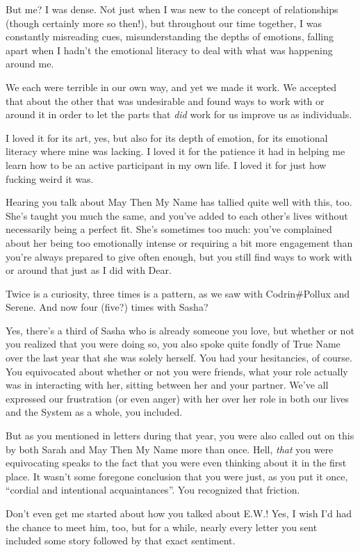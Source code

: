 But me? I was dense. Not just when I was new to the concept of relationships (though certainly more so then!), but throughout our time together, I was constantly misreading cues, misunderstanding the depths of emotions, falling apart when I hadn't the emotional literacy to deal with what was happening around me.

We each were terrible in our own way, and yet we made it work. We accepted that about the other that was undesirable and found ways to work with or around it in order to let the parts that \emph{did} work for us improve us as individuals.

I loved it for its art, yes, but also for its depth of emotion, for its emotional literacy where mine was lacking. I loved it for the patience it had in helping me learn how to be an active participant in my own life. I loved it for just how fucking weird it was.

Hearing you talk about May Then My Name has tallied quite well with this, too. She's taught you much the same, and you've added to each other's lives without necessarily being a perfect fit. She's sometimes too much: you've complained about her being too emotionally intense or requiring a bit more engagement than you're always prepared to give often enough, but you still find ways to work with or around that just as I did with Dear.

Twice is a curiosity, three times is a pattern, as we saw with Codrin\#Pollux and Serene. And now four (five?) times with Sasha?

Yes, there's a third of Sasha who is already someone you love, but whether or not you realized that you were doing so, you also spoke quite fondly of True Name over the last year that she was solely herself. You had your hesitancies, of course. You equivocated about whether or not you were friends, what your role actually was in interacting with her, sitting between her and your partner. We've all expressed our frustration (or even anger) with her over her role in both our lives and the System as a whole, you included.

But as you mentioned in letters during that year, you were also called out on this by both Sarah and May Then My Name more than once. Hell, \emph{that} you were equivocating speaks to the fact that you were even thinking about it in the first place. It wasn't some foregone conclusion that you were just, as you put it once, ``cordial and intentional acquaintances''. You recognized that friction.

Don't even get me started about how you talked about E.W.! Yes, I wish I'd had the chance to meet him, too, but for a while, nearly every letter you sent included some story followed by that exact sentiment.

